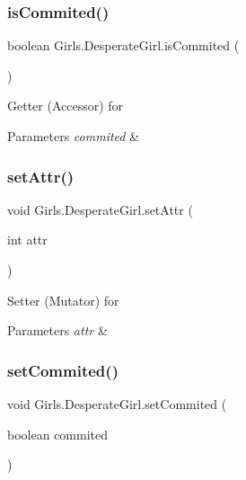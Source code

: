 \subsubsection{\texorpdfstring{is\+Commited()}{isCommited()}}
{\footnotesize\ttfamily boolean Girls.\+Desperate\+Girl.\+is\+Commited (\begin{DoxyParamCaption}{ }\end{DoxyParamCaption})\hspace{0.3cm}{\ttfamily [inline]}}

Getter (Accessor) for 
\begin{DoxyParams}{Parameters}
{\em commited} & \\
\hline
\end{DoxyParams}
\mbox{\label{class_girls_1_1_desperate_girl_a9d1337778c8c5cd44731d06871fd6a82}} 
\subsubsection{\texorpdfstring{set\+Attr()}{setAttr()}}
{\footnotesize\ttfamily void Girls.\+Desperate\+Girl.\+set\+Attr (\begin{DoxyParamCaption}\item[{int}]{attr }\end{DoxyParamCaption})\hspace{0.3cm}{\ttfamily [inline]}}

Setter (Mutator) for 
\begin{DoxyParams}{Parameters}
{\em attr} & \\
\hline
\end{DoxyParams}
\mbox{\label{class_girls_1_1_desperate_girl_a083295aa0508dae190f64ee9fb65e828}} 
\subsubsection{\texorpdfstring{set\+Commited()}{setCommited()}}
{\footnotesize\ttfamily void Girls.\+Desperate\+Girl.\+set\+Commited (\begin{DoxyParamCaption}\item[{boolean}]{commited }\end{DoxyParamCaption})\hspace{0.3cm}{\ttfamily [inline]}}

